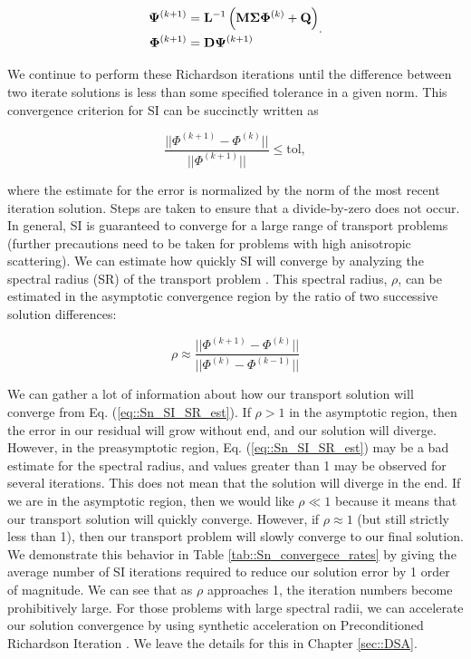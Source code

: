 \begin{equation}
\label{eq::Sn_si_iter}
\begin{aligned}
 {\bf \Psi}^{(k+1)} &= {\bf L}^{-1} \left(  {\bf M} {\bf \Sigma} {\bf \Phi}^{(k)} +  {\bf Q} \right) \\
{\bf \Phi}^{(k+1)} &=  {\bf D} {\bf \Psi}^{(k+1)}
\end{aligned} .
\end{equation}

We continue to perform these Richardson iterations until the difference between two iterate solutions is less than some specified tolerance in a given norm. This convergence criterion for SI can be succinctly written as

\begin{equation}
\label{eq::Sn_SI_conv_crit}
\frac{|| \Phi^{(k+1)} - \Phi^{(k)} ||}{|| \Phi^{(k+1)} ||} \leq \text{tol} ,
\end{equation}

\noindent where the estimate for the error is normalized by the norm of the most recent iteration solution. Steps are taken to ensure that a divide-by-zero does not occur. In general, SI is guaranteed to converge for a large range of transport problems (further precautions need to be taken for problems with high anisotropic scattering). We can estimate how quickly SI will converge by analyzing the spectral radius (SR) of the transport problem \cite{ref::adams_larsen_iter_methods}. This spectral radius, $\rho$, can be estimated in the asymptotic convergence region by the ratio of two successive solution differences:

\begin{equation}
\label{eq::Sn_SI_SR_est}
\rho \approx \frac{|| \Phi^{(k+1)} - \Phi^{(k)} ||}{|| \Phi^{(k)} - \Phi^{(k-1)} ||} 
\end{equation}

\noindent We can gather a lot of information about how our transport solution will converge from Eq. (\ref{eq::Sn_SI_SR_est}). If $\rho>1$ in the asymptotic region, then the error in our residual will grow without end, and our solution will diverge. However, in the preasymptotic region, Eq. (\ref{eq::Sn_SI_SR_est}) may be a bad estimate for the spectral radius, and values greater than 1 may be observed for several iterations. This does not mean that the solution will diverge in the end. If we are in the asymptotic region, then we would like $\rho \ll 1$ because it means that our transport solution will quickly converge. However, if $\rho \approx 1$ (but still strictly less than 1), then our transport problem will slowly converge to our final solution. We demonstrate this behavior in Table \ref{tab::Sn_convergece_rates} by giving the average number of SI iterations required to reduce our solution error by 1 order of magnitude. We can see that as $\rho$ approaches 1, the iteration numbers become prohibitively large. For those problems with large spectral radii, we can accelerate our solution convergence by using synthetic acceleration on Preconditioned Richardson Iteration \cite{ref::adams_larsen_iter_methods}. We leave the details for this in Chapter \ref{sec::DSA}.

